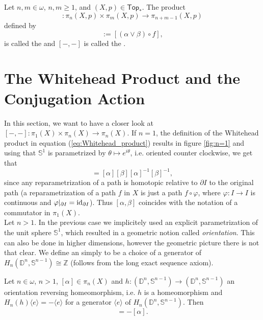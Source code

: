\begin{definition}
	Let $n,m \in \omega$, $n,m \geq 1$, and $(X,p) \in \mathsf{Top}_\ast$. The product
	\begin{equation*}
		[-,-] : \pi_n(X,p) \times \pi_m(X,p) \to \pi_{n + m - 1}(X,p)
	\end{equation*}
	\noindent defined by
	\begin{equation*}
		[\alpha,\beta] := [(\alpha \vee \beta) \circ f], 
	\end{equation*}
	\noindent is called the  and $[-,-]$ is called the .
\end{definition}

\section{The Whitehead Product and the Conjugation Action}
In this section, we want to have a closer look at $[-,-] : \pi_1(X) \times \pi_n(X) \to \pi_n(X)$. If $n = 1$, the definition of the Whitehead product in equation (\ref{eq:Whitehead_product}) results in figure \ref{fig:n=1} and using that $\mathbb{S}^1$ is parametrized by $\theta \mapsto e^{i\theta}$, i.e. oriented counter clockwise, we get that
\begin{equation*}
	[\alpha,\beta] = [\alpha][\beta][\alpha]^{-1}[\beta]^{-1},
\end{equation*}
\noindent since any reparametrization of a path is homotopic relative to $\partial I$ to the original path (a reparametrization of a path $f$ in $X$ is just a path $f \circ \varphi$, where $\varphi : I \to I$ is continuous and $\varphi\vert_{\partial I} = \operatorname{id}_{\partial I}$). Thus $[\alpha,\beta]$ coincides with the notation of a commutator in $\pi_1(X)$.\\
Let $n > 1$. In the previous case we implicitely used an explicit parametrization of the unit sphere $\mathbb{S}^1$, which resulted in a geometric notion called \emph{orientation}. This can also be done in higher dimensions, however the geometric picture there is not that clear. We define an  simply to be a choice of a generator of $H_n(\mathbb{D}^n,\mathbb{S}^{n - 1}) \cong \mathbb{Z}$ (follows from the long exact sequence axiom).  

\begin{lemma}
	\label{lem:order_reversing}
	Let $n \in \omega$, $n > 1$, $[\alpha] \in \pi_n(X)$ and $h : (\mathbb{D}^n,\mathbb{S}^{n - 1}) \to (\mathbb{D}^n,\mathbb{S}^{n - 1})$ an orientation reversing homeomorphism, i.e. $h$ is a homeomorphism and $H_n(h)\langle e \rangle = -\langle e \rangle$ for a generator $\langle e \rangle$ of $H_n(\mathbb{D}^n,\mathbb{S}^{n - 1})$. Then
	\begin{equation*}
		[\alpha \circ h] = -[\alpha].
	\end{equation*}
\end{lemma}

